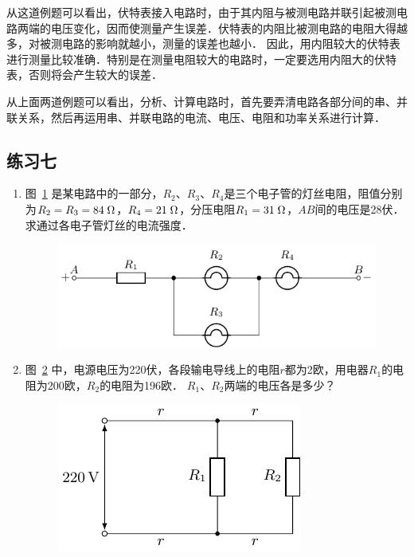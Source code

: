 从这道例题可以看出，伏特表接入电路时，由于其内阻与被测电路并联引起被测电路两端的电压变化，因而使测量产生误差．伏特表的内阻比被测电路的电阻大得越多，对被测电路的影响就越小，测量的误差也越小．
因此，用内阻较大的伏特表进行测量比较准确．特别是在测量电阻较大的电路时，一定要选用内阻大的伏特表，否则将会产生较大的误差．

从上面两道例题可以看出，分析、计算电路时，首先要弄清电路各部分间的串、并联关系，然后再运用串、并联电路的电流、电压、电阻和功率关系进行计算．


\subsection*{练习七}
\begin{enumerate}
    \item 图~\ref{fig_B_7-21} 是某电路中的一部分，$R_2$、$R_3$、$R_4$是三个电子管的灯丝电阻，阻值分别为$R_2=R_3=84 \;\Omega $，$R_4=21 \;\Omega$，分压电阻$R_1=31 \;\Omega$，$AB$间的电压是28伏．
    求通过各电子管灯丝的电流强度．
    \begin{figure}[htbp]
        \centering
        \includegraphics{fig/B/7-21.pdf}
        \caption{}\label{fig_B_7-21}
    \end{figure}

    \item 图~\ref{fig_B_7-22} 中，电源电压为220伏，各段输电导线上的电阻$r$都为2欧，用电器$R_1$的电阻为200欧，$R_2$的电阻为196欧．
    $R_1$、$R_2$两端的电压各是多少？
    \begin{figure}[htbp]
        \centering
        \includegraphics{fig/B/7-22.pdf}
        \caption{}\label{fig_B_7-22}
    \end{figure}


\end{enumerate}
